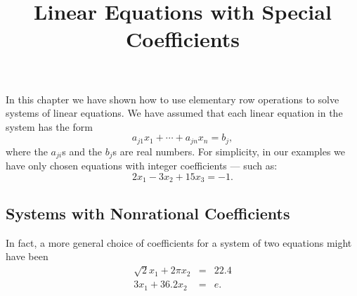 \documentclass{ximera}
\title{Linear Equations with Special Coefficients}
\begin{document}
\begin{abstract}
\end{abstract}
\maketitle


\label{S:specialcoeff}

In this chapter we have shown how to use elementary row
operations to solve systems of linear equations.  We have
assumed that each linear equation in the system has the form
\[
a_{j1}x_1 + \cdots + a_{jn}x_n = b_j,
\]
where the $a_{ji}$s and the $b_j$s are real numbers.  For
simplicity, in our examples we have only chosen equations with
integer coefficients --- such as:
\[
2x_1 - 3x_2 +15x_3 = -1.
\]

\subsection*{Systems with Nonrational Coefficients}

In fact, a more general choice of coefficients for a system of
two equations might have been
\begin{eqnarray}
\sqrt{2}x_1 + 2\pi x_2 & = & 22.4  \nonumber \\
3x_1+36.2 x_2 & = & e. \label{e:irrat}
\end{eqnarray}   
\end{document}
